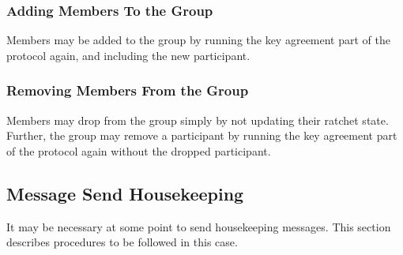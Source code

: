 \documentclass[%
preprint,
amsmath,amssymb,
aps,
prb,
floatfix,
]{revtex4-1}
\begin{document}
\subsubsection{\label{sec:additions}Adding Members To the Group}

Members may be added to the group by running the key agreement part of the
protocol again, and including the new participant.

\subsubsection{\label{sec:removal}Removing Members From the Group}

Members may drop from the group simply by not updating their ratchet state.
Further, the group may remove a participant by running the key agreement part of the
protocol again without the dropped participant.

\subsection{\label{sec:sendhousekeeping}Message Send Housekeeping}
It may be necessary at some point to send housekeeping messages. This section
describes procedures to be followed in this case.
\end{document}
